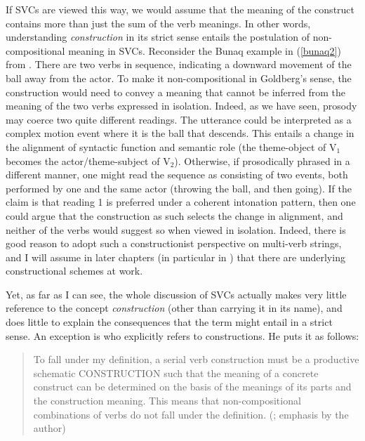 If SVCs are viewed this way, we would assume that the meaning of the construct contains more than just the sum of the verb meanings. In other words, understanding \textit{construction} in its strict sense entails the postulation of non-com\-posi\-tion\-al meaning in SVCs. Reconsider the Bunaq example in (\ref{bunaq2}) from . There are two verbs in sequence, indicating a downward movement of the ball away from the actor. To make it non-compositional in Goldberg's sense, the construction would need to convey a meaning that cannot be inferred from the meaning of the two verbs expressed in isolation. Indeed, as we have seen, prosody may coerce two quite different readings. The utterance could be interpreted as a complex motion event where it is the ball that descends. This entails a change in the alignment of syntactic function and semantic role (the theme-object of V$_1$ becomes the actor/theme-subject of V$_2$). Otherwise, if prosodically phrased in a different manner, one might read the sequence as consisting of two events, both performed by one and the same actor (throwing the ball, and then going). If the claim is that reading 1 is preferred under a coherent intonation pattern, then one could argue that the construction as such selects the change in alignment, and neither of the verbs would suggest so when viewed in isolation. Indeed, there is good reason to adopt such a constructionist perspective on multi-verb strings, and I will assume in later chapters (in particular in ) that there are underlying constructional schemes at work.

Yet, as far as I can see, the whole discussion of SVCs actually makes very little reference to the concept \textit{construction} (other than carrying it in its name), and does little to explain the consequences that the term might entail in a strict sense. An exception is \citet{haspelmath2016serial} who explicitly refers to constructions. He puts it as follows:

\begin{quote}To fall under my definition, a serial verb construction must be a productive schematic
CONSTRUCTION such that the meaning of a concrete construct can be determined on the basis of the meanings of its parts and the construction meaning. This means that non-compositional combinations of verbs do not fall under the definition. (\citealt[6]{haspelmath2016serial}; emphasis by the author) \end{quote}

